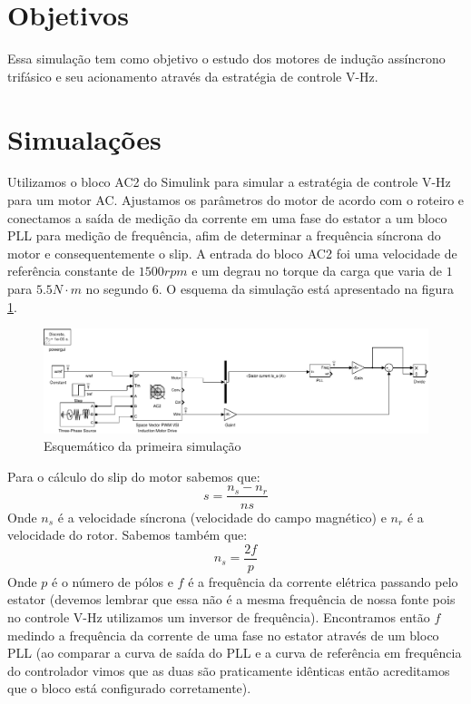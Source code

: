 \documentclass{article}
\begin{document}


\onehalfspacing
\section{Objetivos}
	Essa simulação tem como objetivo o estudo dos motores de indução assíncrono trifásico e seu acionamento através da estratégia de controle V-Hz.
	 
\section{Simualações}
Utilizamos o bloco AC2 do Simulink para simular a estratégia de controle V-Hz para um motor AC. Ajustamos os parâmetros do motor de acordo com o roteiro e conectamos a saída de medição da corrente em uma fase do estator a um bloco PLL para medição de frequência, afim de determinar a frequência síncrona do motor e consequentemente o slip. A entrada do bloco AC2 foi uma velocidade de referência constante de $1500 rpm$ e um degrau no torque da carga que varia de $1$ para $5.5 N\cdot m$ no segundo 6. O esquema da simulação está apresentado na figura \ref{fig:sim1}.
\begin{figure}[H]
	\centering
	\includegraphics[width=\linewidth]{matlab/sim1}
	\caption{Esquemático da primeira simulação}
	\label{fig:sim1}
\end{figure}

Para o cálculo do slip do motor sabemos que:
\begin{equation}
	s = \frac{n_s - n_r}{ns}
\end{equation}
Onde $n_s$ é a velocidade síncrona (velocidade do campo magnético) e $n_r$ é a velocidade do rotor.
Sabemos também que:
\begin{equation}
	n_s = \frac{2f}{p}
\end{equation}
Onde $p$ é o número de pólos e $f$ é a frequência da corrente elétrica passando pelo estator (devemos lembrar que essa não é a mesma frequência de nossa fonte pois no controle V-Hz utilizamos um inversor de frequência). Encontramos então $f$ medindo a frequência da corrente de uma fase no estator através de um bloco PLL (ao comparar a curva de saída do PLL e a curva de referência em frequência do controlador vimos que as duas são praticamente idênticas então acreditamos que o bloco está configurado corretamente).
\end{document}
